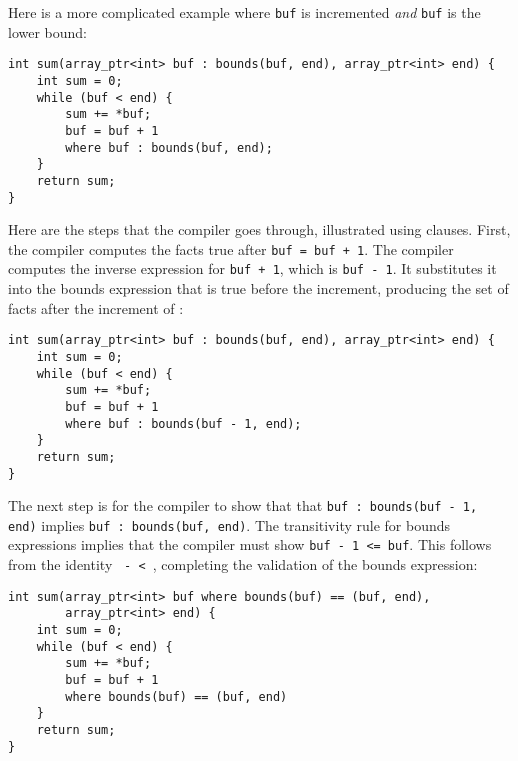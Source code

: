 Here is a more complicated example where \texttt{buf} is incremented
\emph{and} \texttt{buf} is the lower bound:

\begin{verbatim}
int sum(array_ptr<int> buf : bounds(buf, end), array_ptr<int> end) {
    int sum = 0;
    while (buf < end) {
        sum += *buf;   
        buf = buf + 1
        where buf : bounds(buf, end);
    }
    return sum;
}
\end{verbatim}

Here are the steps that the compiler goes through, illustrated using 
 clauses. First, the compiler computes the facts true after
\texttt{buf = buf + 1}. The compiler computes the inverse expression for
\texttt{buf + 1}, which is \texttt{buf - 1}. It substitutes it into the
bounds expression that is true before the increment, producing the set
of facts after the increment of 
\texttt{}:

\begin{verbatim}
int sum(array_ptr<int> buf : bounds(buf, end), array_ptr<int> end) {
    int sum = 0;
    while (buf < end) {
        sum += *buf;   
        buf = buf + 1
        where buf : bounds(buf - 1, end); 
    }
    return sum;
}
\end{verbatim}

The next step is for the compiler to show that that \texttt{buf :
bounds(buf - 1, end)} implies \texttt{buf : bounds(buf, end)}. The
transitivity rule for bounds expressions implies that the compiler must
show \texttt{buf - 1 <= buf}. This follows from the identity
\texttt{ -  < }, completing the validation of the bounds expression:

\begin{verbatim}
int sum(array_ptr<int> buf where bounds(buf) == (buf, end), 
        array_ptr<int> end) {
    int sum = 0;
    while (buf < end) {
        sum += *buf;   
        buf = buf + 1
        where bounds(buf) == (buf, end) 
    }
    return sum;
}
\end{verbatim}